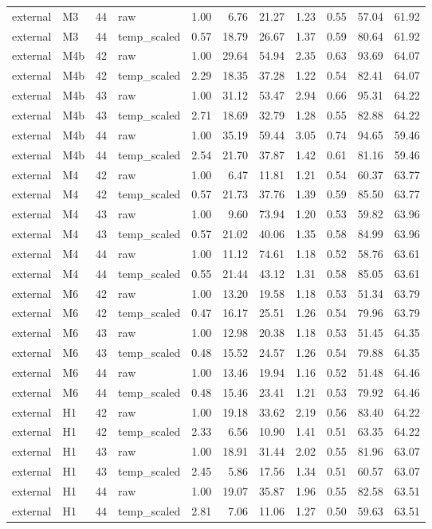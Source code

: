 \begin{tabular}{llrlrrrrrrr}
external & M3 & 44 & raw & 1.00 & 6.76 & 21.27 & 1.23 & 0.55 & 57.04 & 61.92 \\
external & M3 & 44 & temp\_scaled & 0.57 & 18.79 & 26.67 & 1.37 & 0.59 & 80.64 & 61.92 \\
external & M4b & 42 & raw & 1.00 & 29.64 & 54.94 & 2.35 & 0.63 & 93.69 & 64.07 \\
external & M4b & 42 & temp\_scaled & 2.29 & 18.35 & 37.28 & 1.22 & 0.54 & 82.41 & 64.07 \\
external & M4b & 43 & raw & 1.00 & 31.12 & 53.47 & 2.94 & 0.66 & 95.31 & 64.22 \\
external & M4b & 43 & temp\_scaled & 2.71 & 18.69 & 32.79 & 1.28 & 0.55 & 82.88 & 64.22 \\
external & M4b & 44 & raw & 1.00 & 35.19 & 59.44 & 3.05 & 0.74 & 94.65 & 59.46 \\
external & M4b & 44 & temp\_scaled & 2.54 & 21.70 & 37.87 & 1.42 & 0.61 & 81.16 & 59.46 \\
external & M4 & 42 & raw & 1.00 & 6.47 & 11.81 & 1.21 & 0.54 & 60.37 & 63.77 \\
external & M4 & 42 & temp\_scaled & 0.57 & 21.73 & 37.76 & 1.39 & 0.59 & 85.50 & 63.77 \\
external & M4 & 43 & raw & 1.00 & 9.60 & 73.94 & 1.20 & 0.53 & 59.82 & 63.96 \\
external & M4 & 43 & temp\_scaled & 0.57 & 21.02 & 40.06 & 1.35 & 0.58 & 84.99 & 63.96 \\
external & M4 & 44 & raw & 1.00 & 11.12 & 74.61 & 1.18 & 0.52 & 58.76 & 63.61 \\
external & M4 & 44 & temp\_scaled & 0.55 & 21.44 & 43.12 & 1.31 & 0.58 & 85.05 & 63.61 \\
external & M6 & 42 & raw & 1.00 & 13.20 & 19.58 & 1.18 & 0.53 & 51.34 & 63.79 \\
external & M6 & 42 & temp\_scaled & 0.47 & 16.17 & 25.51 & 1.26 & 0.54 & 79.96 & 63.79 \\
external & M6 & 43 & raw & 1.00 & 12.98 & 20.38 & 1.18 & 0.53 & 51.45 & 64.35 \\
external & M6 & 43 & temp\_scaled & 0.48 & 15.52 & 24.57 & 1.26 & 0.54 & 79.88 & 64.35 \\
external & M6 & 44 & raw & 1.00 & 13.46 & 19.94 & 1.16 & 0.52 & 51.48 & 64.46 \\
external & M6 & 44 & temp\_scaled & 0.48 & 15.46 & 23.41 & 1.21 & 0.53 & 79.92 & 64.46 \\
external & H1 & 42 & raw & 1.00 & 19.18 & 33.62 & 2.19 & 0.56 & 83.40 & 64.22 \\
external & H1 & 42 & temp\_scaled & 2.33 & 6.56 & 10.90 & 1.41 & 0.51 & 63.35 & 64.22 \\
external & H1 & 43 & raw & 1.00 & 18.91 & 31.44 & 2.02 & 0.55 & 81.96 & 63.07 \\
external & H1 & 43 & temp\_scaled & 2.45 & 5.86 & 17.56 & 1.34 & 0.51 & 60.57 & 63.07 \\
external & H1 & 44 & raw & 1.00 & 19.07 & 35.87 & 1.96 & 0.55 & 82.58 & 63.51 \\
external & H1 & 44 & temp\_scaled & 2.81 & 7.06 & 11.06 & 1.27 & 0.50 & 59.63 & 63.51 \\
\bottomrule
\end{tabular}
